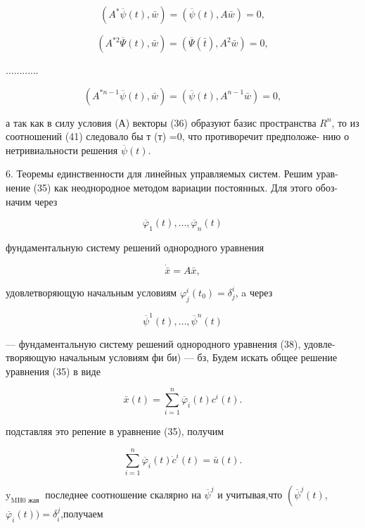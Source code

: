 \documentclass[10pt]{article}
\begin{document}
\[
\left( {{A}^{ * }\overline{\psi }\left( t\right),\bar{w}}\right)  = \left( {\overline{\psi }\left( t\right),A\bar{w}}\right)  = 0,
\]

\[
\left( {{A}^{*2}\overline{\Psi }\left( t\right),\bar{w}}\right)  = \left( {\overline{\Psi }\left( \bar{t}\right),{A}^{2}\bar{w}}\right)  = 0, \tag{41}
\]

............

\[
\left( {{A}^{*n - 1}\overline{\psi }\left( t\right),\bar{w}}\right)  = \left( {\overline{\psi }\left( t\right),{A}^{n - 1}\bar{w}}\right)  = 0,
\]

а так как в силу условия (А) векторы (36) образуют базис пространства \({R}^{n}\), то из соотношений (41) следовало бы т (т) =0, что противоречит предположе- нию о нетривиальности решения \(\overline{\psi }\left( t\right)\).

6. Теоремы единственности для линейных управляемых систем. Решим урав- нение (35) как неоднородное методом вариации постоянных. Для этого обоз- начим через

\[
{\overline{\varphi }}_{1}\left( t\right),\ldots,{\overline{\varphi }}_{n}\left( t\right) \tag{42}
\]

фундаментальную систему решений однородного уравнения

\[
\dot{\bar{x}} = A\bar{x},
\]

удовлетворяющую начальным условиям \({\varphi }_{j}^{i}\left( {t}_{0}\right)  = {\delta }_{j}^{i}\), a через

\[
{\overline{\psi }}^{1}\left( t\right),\ldots,{\overline{\psi }}^{n}\left( t\right)
\]

— фундаментальную систему решений однородного уравнения (38), удовле- творяющую начальным условиям фи би) — бз, Будем искать общее решение уравнения (35) в виде

\[
\bar{x}\left( t\right)  = \mathop{\sum }\limits_{{i = 1}}^{n}{\overline{\varphi }}_{i}\left( t\right) {c}^{i}\left( t\right).
\]

подставляя это репение в уравнение (35), получим

\[
\mathop{\sum }\limits_{{i = 1}}^{n}{\overline{\varphi }}_{i}\left( t\right) {\dot{c}}^{i}\left( t\right)  = \bar{u}\left( t\right).
\]

\({\mathrm{y}}_{\mathrm{{MH}}0\text{ жая }}\) последнее соотношение скалярно на \({\overline{\psi }}^{j}\) и учитывая,что \(\left( {{\overline{\psi }}^{j}\left( t\right) }\right.\), \({\overline{\varphi }}_{i}\left( t\right) ) = {\delta }_{i}^{j}\),получаем
\end{document}

